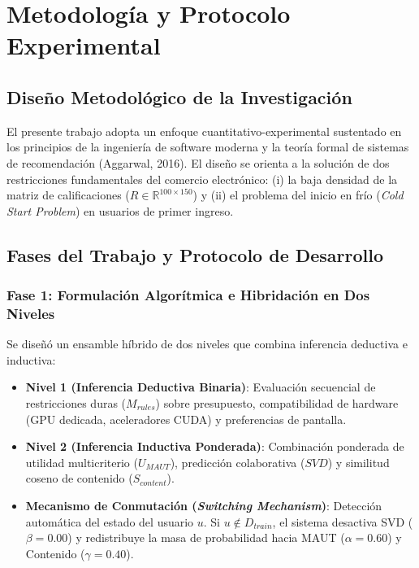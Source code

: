 \documentclass[12pt,a4paper]{article}
\begin{document}
\section{Metodología y Protocolo Experimental}

\subsection{Diseño Metodológico de la Investigación}
El presente trabajo adopta un enfoque cuantitativo-experimental sustentado en los principios de la ingeniería de software moderna y la teoría formal de sistemas de recomendación (Aggarwal, 2016). El diseño se orienta a la solución de dos restricciones fundamentales del comercio electrónico: (i) la baja densidad de la matriz de calificaciones ($R \in \mathbb{R}^{100 \times 150}$) y (ii) el problema del inicio en frío (\textit{Cold Start Problem}) en usuarios de primer ingreso.

\subsection{Fases del Trabajo y Protocolo de Desarrollo}

\subsubsection{Fase 1: Formulación Algorítmica e Hibridación en Dos Niveles}
Se diseñó un ensamble híbrido de dos niveles que combina inferencia deductiva e inductiva:
\begin{itemize}
    \item \textbf{Nivel 1 (Inferencia Deductiva Binaria)}: Evaluación secuencial de restricciones duras ($M_{rules}$) sobre presupuesto, compatibilidad de hardware (GPU dedicada, aceleradores CUDA) y preferencias de pantalla.
    \item \textbf{Nivel 2 (Inferencia Inductiva Ponderada)}: Combinación ponderada de utilidad multicriterio ($U_{MAUT}$), predicción colaborativa ($SVD$) y similitud coseno de contenido ($S_{content}$).
    \item \textbf{Mecanismo de Conmutación (\textit{Switching Mechanism})}: Detección automática del estado del usuario $u$. Si $u \notin D_{train}$, el sistema desactiva SVD ($\beta = 0.00$) y redistribuye la masa de probabilidad hacia MAUT ($\alpha = 0.60$) y Contenido ($\gamma = 0.40$).
\end{itemize}
\end{document}
